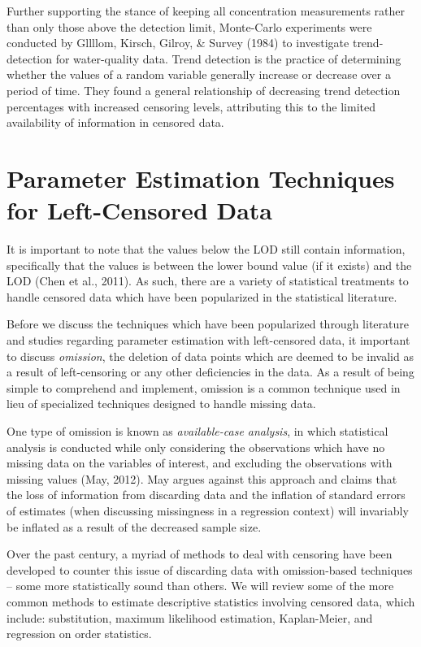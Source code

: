 \documentclass[12pt, twoside]{amherstthesis}
\begin{document}
Further supporting the stance of keeping all concentration measurements rather than only those above the detection limit, Monte-Carlo experiments were conducted by Gllllom, Kirsch, Gilroy, \& Survey (1984) to investigate trend-detection for water-quality data. Trend detection is the practice of determining whether the values of a random variable generally increase or decrease over a period of time. They found a general relationship of decreasing trend detection percentages with increased censoring levels, attributing this to the limited availability of information in censored data.

\hypertarget{Approaches}{%
\section{Parameter Estimation Techniques for Left-Censored Data}\label{Approaches}}

It is important to note that the values below the LOD still contain information, specifically that the values is between the lower bound value (if it exists) and the LOD (Chen et al., 2011). As such, there are a variety of statistical treatments to handle censored data which have been popularized in the statistical literature.

Before we discuss the techniques which have been popularized through literature and studies regarding parameter estimation with left-censored data, it important to discuss \emph{omission}, the deletion of data points which are deemed to be invalid as a result of left-censoring or any other deficiencies in the data. As a result of being simple to comprehend and implement, omission is a common technique used in lieu of specialized techniques designed to handle missing data.

One type of omission is known as \emph{available-case analysis}, in which statistical analysis is conducted while only considering the observations which have no missing data on the variables of interest, and excluding the observations with missing values (May, 2012). May argues against this approach and claims that the loss of information from discarding data and the inflation of standard errors of estimates (when discussing missingness in a regression context) will invariably be inflated as a result of the decreased sample size.

Over the past century, a myriad of methods to deal with censoring have been developed to counter this issue of discarding data with omission-based techniques -- some more statistically sound than others. We will review some of the more common methods to estimate descriptive statistics involving censored data, which include: substitution, maximum likelihood estimation, Kaplan-Meier, and regression on order statistics.
\end{document}
